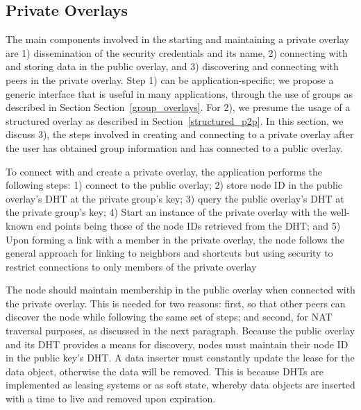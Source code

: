 \documentclass[conference]{IEEEtran}
\begin{document}
\subsection{Private Overlays}
The main components involved in the starting and maintaining a private overlay
are 1) dissemination of the security credentials and its name, 2) connecting
with and storing data in the public overlay, and 3) discovering and connecting
with peers in the private overlay.  Step 1) can be application-specific; we
propose a generic interface that is useful in many applications, through the use of groups as described in Section
Section~\ref{group_overlays}.  For 2), we presume the usage of a structured
overlay as described in Section~\ref{structured_p2p}.  In this section, we
discuss 3), the steps involved in creating and connecting to a private overlay
after the user has obtained group information and has connected to a public
overlay.

To connect with and create a private overlay, the application performs the
following steps: 1) connect to the public overlay; 2) store node ID in the
public overlay's DHT at the private group's key; 3) query the public overlay's
DHT at the private group's key; 4) Start an instance of the private overlay with
the well-known end points being those of the node IDs retrieved from the DHT;
and 5) Upon forming a link with a member in the private overlay, the node follows
the general approach for linking to neighbors and shortcuts but using security
to restrict connections to only members of the private overlay

The node should maintain membership in the public overlay when connected with
the private overlay.  This is needed for two reasons: first, so that other peers can discover the
node while following the same set of steps; and second, for NAT traversal purposes, as
discussed in the next paragraph.  Because the public overlay and its DHT
provides a means for discovery, nodes must maintain their node ID in the public
key's DHT.  A data inserter must constantly update the lease for the data
object, otherwise the data will be removed.  This is because DHTs are
implemented as leasing systems or as soft state, whereby data objects are
inserted with a time to live and removed upon expiration.
\end{document}
